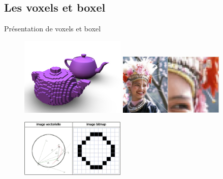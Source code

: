 \documentclass{beamer}
\begin{document}
\subsection{Les voxels et boxel}
\begin{frame}{Présentation de voxels et boxel}
  \begin{center}
    \begin{figure}
      \includegraphics[width=5cm]{Images/Images_Alexis/voxel_teapot.jpg}
      \includegraphics[width=5cm]{Images/Images_Alexis/example_matricielle.jpg}
    \end{figure}
    \begin{figure}
      \includegraphics[width=5cm]{Images/Images_Alexis/comparaison_vecteur_matrice.png}
    \end{figure}
  \end{center}
\end{frame}
\end{document}
